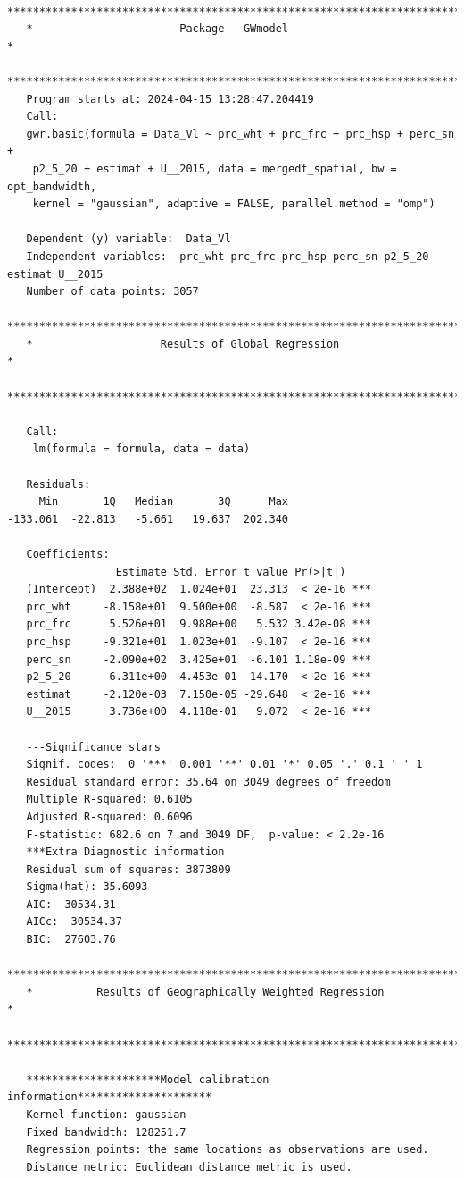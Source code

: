 \documentclass[
]{article}
\begin{document}
\begin{verbatim}
   ***********************************************************************
   *                       Package   GWmodel                             *
   ***********************************************************************
   Program starts at: 2024-04-15 13:28:47.204419 
   Call:
   gwr.basic(formula = Data_Vl ~ prc_wht + prc_frc + prc_hsp + perc_sn + 
    p2_5_20 + estimat + U__2015, data = mergedf_spatial, bw = opt_bandwidth, 
    kernel = "gaussian", adaptive = FALSE, parallel.method = "omp")

   Dependent (y) variable:  Data_Vl
   Independent variables:  prc_wht prc_frc prc_hsp perc_sn p2_5_20 estimat U__2015
   Number of data points: 3057
   ***********************************************************************
   *                    Results of Global Regression                     *
   ***********************************************************************

   Call:
    lm(formula = formula, data = data)

   Residuals:
     Min       1Q   Median       3Q      Max 
-133.061  -22.813   -5.661   19.637  202.340 

   Coefficients:
                 Estimate Std. Error t value Pr(>|t|)    
   (Intercept)  2.388e+02  1.024e+01  23.313  < 2e-16 ***
   prc_wht     -8.158e+01  9.500e+00  -8.587  < 2e-16 ***
   prc_frc      5.526e+01  9.988e+00   5.532 3.42e-08 ***
   prc_hsp     -9.321e+01  1.023e+01  -9.107  < 2e-16 ***
   perc_sn     -2.090e+02  3.425e+01  -6.101 1.18e-09 ***
   p2_5_20      6.311e+00  4.453e-01  14.170  < 2e-16 ***
   estimat     -2.120e-03  7.150e-05 -29.648  < 2e-16 ***
   U__2015      3.736e+00  4.118e-01   9.072  < 2e-16 ***

   ---Significance stars
   Signif. codes:  0 '***' 0.001 '**' 0.01 '*' 0.05 '.' 0.1 ' ' 1 
   Residual standard error: 35.64 on 3049 degrees of freedom
   Multiple R-squared: 0.6105
   Adjusted R-squared: 0.6096 
   F-statistic: 682.6 on 7 and 3049 DF,  p-value: < 2.2e-16 
   ***Extra Diagnostic information
   Residual sum of squares: 3873809
   Sigma(hat): 35.6093
   AIC:  30534.31
   AICc:  30534.37
   BIC:  27603.76
   ***********************************************************************
   *          Results of Geographically Weighted Regression              *
   ***********************************************************************

   *********************Model calibration information*********************
   Kernel function: gaussian 
   Fixed bandwidth: 128251.7 
   Regression points: the same locations as observations are used.
   Distance metric: Euclidean distance metric is used.


\end{verbatim}
\end{document}
